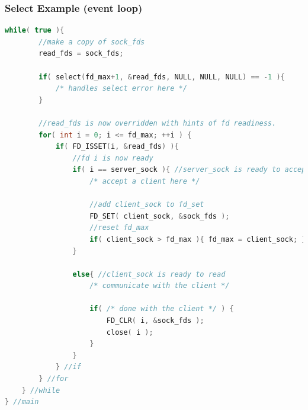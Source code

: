 \documentclass[aspectratio=43]{beamer}
\begin{document}
\begin{frame}[fragile]
  \frametitle{Select Example (event loop) }
 \begin{lstlisting}[language=C++,basicstyle=\ttfamily\tiny,commentstyle=\color{commgreen},keywordstyle=\color{blue},breaklines=true]
    while( true ){
        //make a copy of sock_fds
        read_fds = sock_fds;
        
        if( select(fd_max+1, &read_fds, NULL, NULL, NULL) == -1 ){
            /* handles select error here */
        }
        
        //read_fds is now overridden with hints of fd readiness.
        for( int i = 0; i <= fd_max; ++i ) {
            if( FD_ISSET(i, &read_fds) ){
                //fd i is now ready
                if( i == server_sock ){ //server_sock is ready to accept
                    /* accept a client here */
                    
                    //add client_sock to fd_set
                    FD_SET( client_sock, &sock_fds );
                    //reset fd_max
                    if( client_sock > fd_max ){ fd_max = client_sock; }
                }
                
                else{ //client_sock is ready to read
                    /* communicate with the client */
                
                    if( /* done with the client */ ) {
                        FD_CLR( i, &sock_fds ); 
                        close( i );
                    }
                }
            } //if
        } //for
    } //while
} //main
       \end{lstlisting}
\end{frame}
\end{document}
